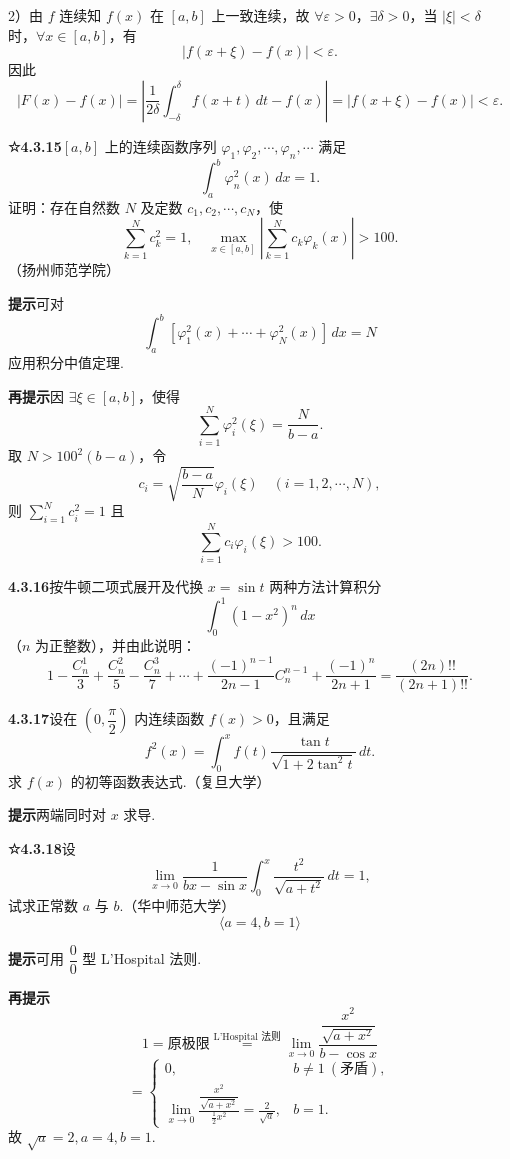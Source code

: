 \documentclass[UTF8,12pt,a4paper,fontset=fandol]{ctexart}
\begin{document}
2）由 $f$ 连续知 $f(x)$ 在 $[a,b]$ 上一致连续，故 $\forall\varepsilon>0$，$\exists\delta>0$，当 $|\xi|<\delta$ 时，$\forall x\in[a,b]$，有
\[
|f(x+\xi)-f(x)|<\varepsilon.
\]
因此
\[
|F(x)-f(x)|
=\left|\frac1{2\delta}\int_{-\delta}^{\delta}f(x+t)\,dt-f(x)\right|
=|f(x+\xi)-f(x)|<\varepsilon.
\]

\noindent\textbf{☆4.3.15}\quad $[a,b]$ 上的连续函数序列 $\varphi_1,\varphi_2,\cdots,\varphi_n,\cdots$ 满足
\[
\int_a^b\varphi_n^2(x)\,dx=1.
\]
证明：存在自然数 $N$ 及定数 $c_1,c_2,\cdots,c_N$，使
\[
\sum_{k=1}^N c_k^2=1,\quad
\max_{x\in[a,b]}\left|\sum_{k=1}^N c_k\varphi_k(x)\right|>100.
\]
（扬州师范学院）

\noindent\textbf{提示}\quad 可对
\[
\int_a^b[\varphi_1^2(x)+\cdots+\varphi_N^2(x)]\,dx=N
\]
应用积分中值定理.

\noindent\textbf{再提示}\quad 因 $\exists\xi\in[a,b]$，使得
\[
\sum_{i=1}^N\varphi_i^2(\xi)=\frac N{b-a}.
\]
取 $N>100^2(b-a)$，令
\[
c_i=\sqrt{\frac{b-a}{N}}\varphi_i(\xi)\quad(i=1,2,\cdots,N),
\]
则 $\sum_{i=1}^N c_i^2=1$ 且
\[
\sum_{i=1}^N c_i\varphi_i(\xi)>100.
\]

\noindent\textbf{4.3.16}\quad 按牛顿二项式展开及代换 $x=\sin t$ 两种方法计算积分
\[
\int_0^1(1-x^2)^n\,dx
\]
（$n$ 为正整数），并由此说明：
\[
1-\frac{C_n^1}{3}+\frac{C_n^2}{5}-\frac{C_n^3}{7}+\cdots
+\frac{(-1)^{n-1}}{2n-1}C_n^{n-1}+\frac{(-1)^n}{2n+1}
=\frac{(2n)!!}{(2n+1)!!}.
\]

\noindent\textbf{4.3.17}\quad 设在 $\left(0,\dfrac\pi2\right)$ 内连续函数 $f(x)>0$，且满足
\[
f^2(x)=\int_0^x f(t)\frac{\tan t}{\sqrt{1+2\tan^2t}}\,dt.
\]
求 $f(x)$ 的初等函数表达式.（复旦大学）

\noindent\textbf{提示}\quad 两端同时对 $x$ 求导.

\noindent\textbf{☆4.3.18}\quad 设
\[
\lim_{x\to0}\frac1{bx-\sin x}\int_0^x\frac{t^2}{\sqrt{a+t^2}}\,dt=1,
\]
试求正常数 $a$ 与 $b$.（华中师范大学）
\[
\langle a=4,b=1\rangle
\]

\noindent\textbf{提示}\quad 可用 $\dfrac00$ 型 L'Hospital 法则.

\noindent\textbf{再提示}\quad
\[
1=\text{原极限}\stackrel{\text{L'Hospital 法则}}{=}
\lim_{x\to0}\frac{\dfrac{x^2}{\sqrt{a+x^2}}}{b-\cos x}
\]
\[
=\begin{cases}
0,&b\ne1\ (\text{矛盾}),\\[0.4em]
\displaystyle\lim_{x\to0}\frac{\dfrac{x^2}{\sqrt{a+x^2}}}{\frac12x^2}
=\frac2{\sqrt a},&b=1.
\end{cases}
\]
故 $\sqrt a=2,a=4,b=1$.
\end{document}
